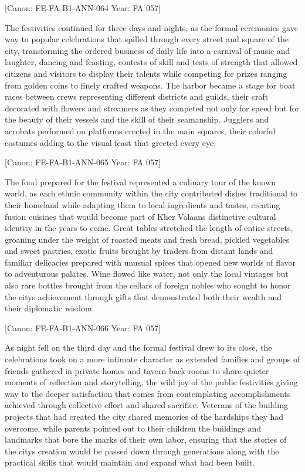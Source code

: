{[}Canon: FE-FA-B1-ANN-064 \textbar{} Year: FA 057{]}

The festivities continued for three days and nights, as the formal
ceremonies gave way to popular celebrations that spilled through every
street and square of the city, transforming the ordered business of
daily life into a carnival of music and laughter, dancing and feasting,
contests of skill and tests of strength that allowed citizens and
visitors to display their talents while competing for prizes ranging
from golden coins to finely crafted weapons. The harbor became a stage
for boat races between crews representing different districts and
guilds, their craft decorated with flowers and streamers as they
competed not only for speed but for the beauty of their vessels and the
skill of their seamanship. Jugglers and acrobats performed on platforms
erected in the main squares, their colorful costumes adding to the
visual feast that greeted every eye.

{[}Canon: FE-FA-B1-ANN-065 \textbar{} Year: FA 057{]}

The food prepared for the festival represented a culinary tour of the
known world, as each ethnic community within the city contributed dishes
traditional to their homeland while adapting them to local ingredients
and tastes, creating fusion cuisines that would become part of Kher
Valaan\textquotesingle s distinctive cultural identity in the years to
come. Great tables stretched the length of entire streets, groaning
under the weight of roasted meats and fresh bread, pickled vegetables
and sweet pastries, exotic fruits brought by traders from distant lands
and familiar delicacies prepared with unusual spices that opened new
worlds of flavor to adventurous palates. Wine flowed like water, not
only the local vintages but also rare bottles brought from the cellars
of foreign nobles who sought to honor the city\textquotesingle s
achievement through gifts that demonstrated both their wealth and their
diplomatic wisdom.

{[}Canon: FE-FA-B1-ANN-066 \textbar{} Year: FA 057{]}

As night fell on the third day and the formal festival drew to its
close, the celebrations took on a more intimate character as extended
families and groups of friends gathered in private homes and tavern back
rooms to share quieter moments of reflection and storytelling, the wild
joy of the public festivities giving way to the deeper satisfaction that
comes from contemplating accomplishments achieved through collective
effort and shared sacrifice. Veterans of the building projects that had
created the city shared memories of the hardships they had overcome,
while parents pointed out to their children the buildings and landmarks
that bore the marks of their own labor, ensuring that the stories of the
city\textquotesingle s creation would be passed down through generations
along with the practical skills that would maintain and expand what had
been built.

